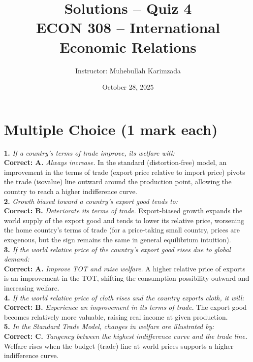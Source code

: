 \documentclass[12pt]{article}
\title{Solutions -- Quiz 4\\ \vspace{8pt} \Large ECON 308 -- International Economic Relations}
\author{Instructor: Muhebullah Karimzada}
\date{October 28,  2025}
\begin{document}
\maketitle

\section*{Multiple Choice (1 mark each)}

\textbf{1.} \emph{If a country’s terms of trade improve, its welfare will:} \\
\textbf{Correct: A.} \textit{Always increase.} In the standard (distortion-free) model, an improvement in the terms of trade (export price relative to import price) pivots the trade (isovalue) line outward around the production point, allowing the country to reach a higher indifference curve.\\[0.6em]

\textbf{2.} \emph{Growth biased toward a country’s export good tends to:}\\
\textbf{Correct: B.} \textit{Deteriorate its terms of trade.} Export-biased growth expands the world supply of the export good and tends to lower its relative price, worsening the home country’s terms of trade (for a price-taking small country, prices are exogenous, but the sign remains the same in general equilibrium intuition).\\[0.6em]

\textbf{3.} \emph{If the world relative price of the country’s export good rises due to global demand:}\\
\textbf{Correct: A.} \textit{Improve TOT and raise welfare.} A higher relative price of exports is an improvement in the TOT, shifting the consumption possibility outward and increasing welfare.\\[0.6em]

\textbf{4.} \emph{If the world relative price of cloth rises and the country exports cloth, it will:}\\
\textbf{Correct: B.} \textit{Experience an improvement in its terms of trade.} The export good becomes relatively more valuable, raising real income at given production.\\[0.6em]

\textbf{5.} \emph{In the Standard Trade Model, changes in welfare are illustrated by:}\\
\textbf{Correct: C.} \textit{Tangency between the highest indifference curve and the trade line.} Welfare rises when the budget (trade) line at world prices supports a higher indifference curve.
\end{document}
